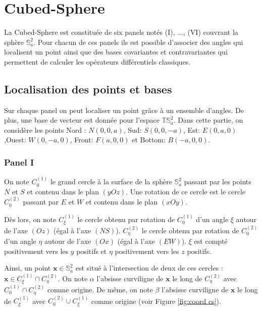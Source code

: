 \chapter{Cubed-Sphere}

La Cubed-Sphere est constituée de six panels notés (I), ..., (VI) couvrant la sphère $\mathbb{S}_a^2$. Pour chacun de ces panels ils est possible d'associer des angles qui localisent un point ainsi que des bases covariantes et contravariantes qui permettent de calculer les opérateurs différentiels classiques.

\section{Localisation des points et bases}

Sur chaque panel on peut localiser un point grâce à un ensemble d'angles. De plus, une base de vecteur est donnée pour l'espace $\mathbb{T}\mathbb{S}_a^2$. Dans cette partie, on considère les points Nord : $N (0,0,a)$, Sud: $S (0,0,-a)$, Est: $E (0,a,0)$,Ouest: $W (0,-a,0)$, Front: $F(a,0,0)$ et Bottom: $B(-a,0,0)$. 

\subsection{Panel I}

On note $C_0^{(1)}$ le grand cercle à la surface de la sphère $\mathbb{S}_a^2$ passant par les points $N$ et $S$ et contenu dans le plan $(yOz)$. Une rotation de ce cercle est le cercle $C_0^{(2)}$ passant par $E$ et $W$ et contenu dans le plan $(xOy)$.

Dès lors, on note $C_{\xi}^{(1)}$ le cercle obtenu par rotation de $C_0^{(1)}$ d'un angle $\xi$ autour de l'axe $(Oz)$ (égal à l'axe $(NS)$). $C_{\eta}^{(2)}$ le cercle obtenu par rotation de $C_0^{(2)}$ d'un angle $\eta$ autour de l'axe $(Ox)$ (égal à l'axe $(EW)$). $\xi$ est compté positivement vers les $y$ positifs et $\eta$ positivement vers les $z$ positifs.

Ainsi, un point $\mathbf{x} \in \mathbb{S}_a^2$ est situé à l'intersection de deux de ces cercles : $\mathbf{x} \in C_{\xi}^{(1)} \cap C_{\eta}^{(2)}$. On note $\alpha$ l'absisse curviligne de $\mathbf{x}$ le long de $C_{\eta}^{(2)}$ avec $C_{0}^{(1)}\cap C_{\eta}^{(2)}$ comme origine. De même, on note $\beta$ l'absisse curviligne de $\mathbf{x}$ le long de $C_{\xi}^{(1)}$ avec $C_{0}^{(2)}\cup C_{\xi}^{(1)}$ comme origine (voir Figure \ref{fig:coord cs}). 

